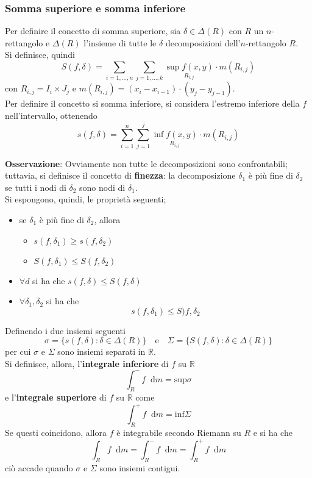 \documentclass[a4paper]{extarticle}
\newcommand*\dif{\mathop{}\!\mathrm{d}}
\begin{document}
\vspace{1em}
\subsubsection{Somma superiore e somma inferiore}
Per definire il concetto di somma superiore, sia $\delta \in \Delta(R)$ con $R$ un $n$-rettangolo e $\Delta(R)$ l'insieme di tutte le $\delta$ decomposizioni dell'$n$-rettangolo $R$.\\
Si definisce, quindi
\[S(f,\delta) = \sum_{i=1,\dots,n} \sum_{j=1,\dots,k} \underset{R_{i,j}}{\sup f(x,y)} \cdot m(R_{i,j})\]
con $R_{i,j} = I_i \times J_j$ e $m(R_{i,j}) = (x_i - x_{i-1}) \cdot (y_j - y_{j-1})$.\\
Per definire il concetto si somma inferiore, si considera l'estremo inferiore della $f$ nell'intervallo, ottenendo
\[s(f,\delta) = \sum_{i=1}^n \sum_{j=1}^j \underset{R_{i,j}}{\inf f(x,y)} \cdot m(R_{i,j})\]

\vspace{1em}
\noindent
\textbf{Osservazione}: Ovviamente non tutte le decomposizioni sono confrontabili; tuttavia, si definisce il concetto di \textbf{finezza}: la decomposizione $\delta_1$ è più fine di $\delta_2$ se tutti i nodi di $\delta_2$ sono nodi di $\delta_1$.\\
Si espongono, quindi, le proprietà seguenti;
\begin{itemize}
    \item se $\delta_1$ è più fine di $\delta_2$, allora
    \begin{itemize}
        \item $s(f,\delta_1) \geq s(f,\delta_2)$
        \item $S(f,\delta_1) \leq S(f,\delta_2)$
    \end{itemize}
    \item $\forall d$ si ha che $s(f,\delta) \leq S(f,\delta)$
    \item $\forall \delta_1,\delta_2$ si ha che
    \[s(f,\delta_1) \leq S)f,\delta_2\]
\end{itemize}
Definendo i due insiemi seguenti
\[\sigma = \{s(f,\delta) : \delta \in \Delta(R)\} \hspace{1em} \text{e} \hspace{1em} \Sigma = \{S(f,\delta) : \delta \in \Delta (R)\}\]
per cui $\sigma$ e $\Sigma$ sono insiemi separati in $\mathbb{R}$.\\
Si definisce, allora, l'\textbf{integrale inferiore} di $f$ su $\mathbb{R}$
\[\int_R^- f \dif m = \text{sup} \sigma\]
e l'\textbf{integrale superiore} di $f$ su $\mathbb{R}$ come
\[\int_R^+ f \dif m = \text{inf} \Sigma\]
Se questi coincidono, allora $f$ è integrabile secondo Riemann su $R$ e si ha che
\[\int_R f \dif m = \int_R^- f \dif m = \int_R^+ f \dif m\]
ciò accade quando $\sigma$ e $\Sigma$ sono insiemi contigui.
\end{document}
